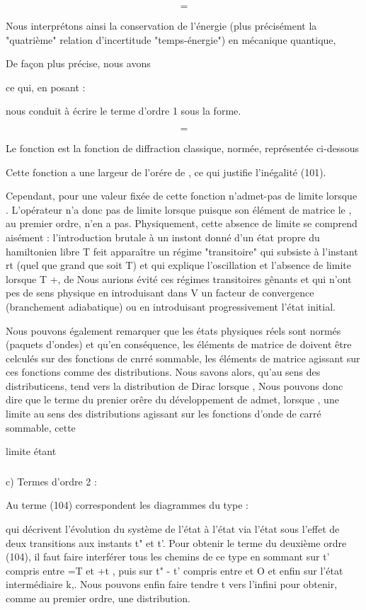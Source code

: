 \[
\tag{101}=
\]

Nous interprétons ainsi la conservation de l'énergie
(plus précisément la "quatrième" relation d'incertitude "temps-énergie") en mécanique quantique,

De façon plus précise, nous avons

ce qui, en posant :

nous conduit à écrire le terme d'ordre 1 sous la forme.

\[
\tag{103}=
\]

Le fonction  est la fonction de diffraction classique, normée, représentée ci-dessous

%
Cette fonction a une largeur de l'orére de , ce qui justifie
l'inégalité (101).

Cependant, pour une valeur fixée de cette fonction
n'admet-pas de limite lorsque . L'opérateur  n'a donc
pas de limite lorsque  puisque son élément de matrice
le , au premier ordre, n'en a pas. Physiquement,
cette absence de limite se comprend aisément : l'introduction brutale
à un instont donné  d'un état propre  du hamiltonien libre T
feit apparaître un régime "transitoire" qui subsiste à l'instant rt (quel
que grand que soit T) et qui explique l'oscillation et l'absence de limite
lorsque T +, de  Nous aurions évité ces
régimes transitoires gênants et qui n'ont pes de sens physique en introduisant
dans V un facteur de convergence (branchement adiabatique) ou en
introduisant progressivement l'état initial.

Nous pouvons également remarquer que les états physiques réels
sont normés (paquets d'ondes) et qu'en conséquence, les éléments de matrice
de  doivent être celculés sur des fonctions de cnrré sommable,
les éléments de matrice  agissant sur ces fonctions
comme des distributions. Nous savons alors, qu'au sens des distributicens,
 tend vers la distribution de Dirac  lorsque
, Nous pouvons donc dire que le terme du prenier orêre du développement
de  admet, lorsque  , une limite au sens des
distributions agissant sur les fonctions d'onde de carré sommable, cette

limite étant


\subsubsection{}%
c) Termes d'ordre 2 :

Au terme (104) correspondent les diagrammes du type :

qui décrivent l'évolution du système de l'état  à l'état
 via l'état  sous l'effet de deux transitions aux
instants t" et t'. Pour obtenir le terme du deuxième ordre (104),
il faut faire interférer tous les chemins de ce type en sommant
sur t' compris entre =T et +t , puis sur t" - t' compris entre
 et O et enfin sur l'état intermédiaire k,. Nous pouvons enfin
faire tendre t vers l'infini pour obtenir, comme au premier ordre,
une distribution.

